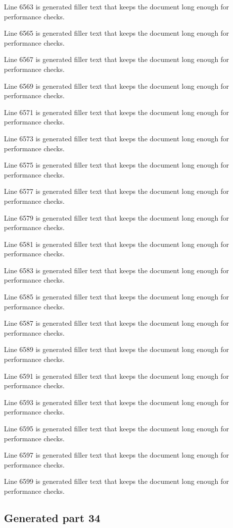 Line 6563 is generated filler text that keeps the document long enough for performance checks.

Line 6565 is generated filler text that keeps the document long enough for performance checks.

Line 6567 is generated filler text that keeps the document long enough for performance checks.

Line 6569 is generated filler text that keeps the document long enough for performance checks.

Line 6571 is generated filler text that keeps the document long enough for performance checks.

Line 6573 is generated filler text that keeps the document long enough for performance checks.

Line 6575 is generated filler text that keeps the document long enough for performance checks.

Line 6577 is generated filler text that keeps the document long enough for performance checks.

Line 6579 is generated filler text that keeps the document long enough for performance checks.

Line 6581 is generated filler text that keeps the document long enough for performance checks.

Line 6583 is generated filler text that keeps the document long enough for performance checks.

Line 6585 is generated filler text that keeps the document long enough for performance checks.

Line 6587 is generated filler text that keeps the document long enough for performance checks.

Line 6589 is generated filler text that keeps the document long enough for performance checks.

Line 6591 is generated filler text that keeps the document long enough for performance checks.

Line 6593 is generated filler text that keeps the document long enough for performance checks.

Line 6595 is generated filler text that keeps the document long enough for performance checks.

Line 6597 is generated filler text that keeps the document long enough for performance checks.

Line 6599 is generated filler text that keeps the document long enough for performance checks.

\subsection{Generated part 34}

